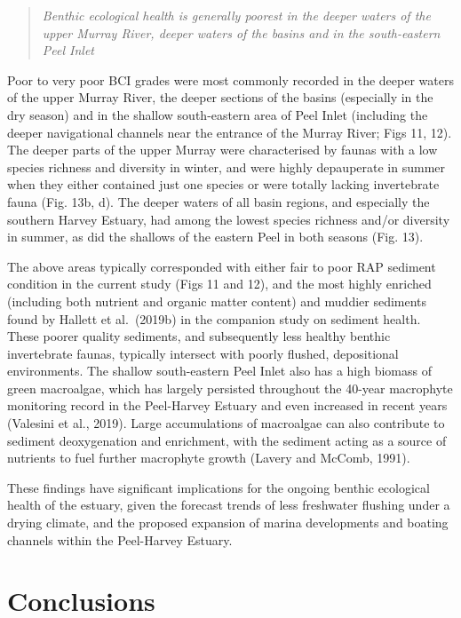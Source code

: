 \documentclass[
]{book}
\begin{document}
\begin{quote}
\emph{Benthic ecological health is generally poorest in the deeper waters of the upper Murray River, deeper waters of the basins and in the south-eastern Peel Inlet}
\end{quote}

Poor to very poor BCI grades were most commonly recorded in the deeper waters of the upper Murray River, the deeper sections of the basins (especially in the dry season) and in the shallow south-eastern area of Peel Inlet (including the deeper navigational channels near the entrance of the Murray River; Figs 11, 12). The deeper parts of the upper Murray were characterised by faunas with a low species richness and diversity in winter, and were highly depauperate in summer when they either contained just one species or were totally lacking invertebrate fauna (Fig. 13b, d). The deeper waters of all basin regions, and especially the southern Harvey Estuary, had among the lowest species richness and/or diversity in summer, as did the shallows of the eastern Peel in both seasons (Fig. 13).

The above areas typically corresponded with either fair to poor RAP sediment condition in the current study (Figs 11 and 12), and the most highly enriched (including both nutrient and organic matter content) and muddier sediments found by Hallett et al.~(2019b) in the companion study on sediment health. These poorer quality sediments, and subsequently less healthy benthic invertebrate faunas, typically intersect with poorly flushed, depositional environments. The shallow south-eastern Peel Inlet also has a high biomass of green macroalgae, which has largely persisted throughout the 40-year macrophyte monitoring record in the Peel-Harvey Estuary and even increased in recent years (Valesini et al., 2019). Large accumulations of macroalgae can also contribute to sediment deoxygenation and enrichment, with the sediment acting as a source of nutrients to fuel further macrophyte growth (Lavery and McComb, 1991).

These findings have significant implications for the ongoing benthic ecological health of the estuary, given the forecast trends of less freshwater flushing under a drying climate, and the proposed expansion of marina developments and boating channels within the Peel-Harvey Estuary.

\hypertarget{conclusions}{%
\section{Conclusions}\label{conclusions}}
\end{document}
